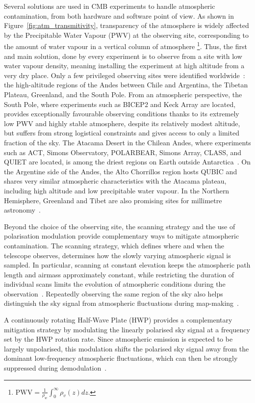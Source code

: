 \documentclass[a4paper,11pt]{article}
\begin{document}
Several solutions are used in CMB experiments to handle atmospheric contamination, from both hardware and software point of view. 
As shown in Figure~\ref{fig:atm_transmitivity}, transparency of the atmosphere is widely affected by the Precipitable Water Vapour (PWV) at the observing site, corresponding to the amount of water vapour in a vertical column of atmosphere \footnote{$\mathrm{PWV} = \frac{1}{\rho_w} \int_0^{\infty} \rho_v(z) dz.$}. Thus, the first and main solution, done by every experiment is to observe from a site with low water vapour density, meaning installing the experiment at high altitude from a very dry place. Only a few privileged observing sites were identified worldwide~\cite{Suen_2014}: the high-altitude regions of the Andes between Chile and Argentina, the Tibetan Plateau, Greenland, and the South Pole. From an atmospheric perspective, the South Pole, where experiments such as BICEP2 and Keck Array are located, provides exceptionally favourable observing conditions thanks to its extremely low PWV and highly stable atmosphere, despite its relatively modest altitude, but suffers from strong logistical constraints and gives access to only a limited fraction of the sky. The Atacama Desert in the Chilean Andes, where experiments such as ACT, Simons Observatory, POLARBEAR, Simons Array, CLASS, and QUIET are located, is among the driest regions on Earth outside Antarctica~\cite{Atacama}. On the Argentine side of the Andes, the Alto Chorrillos region hosts QUBIC and shares very similar atmospheric characteristics with the Atacama plateau, including high altitude and low precipitable water vapour. In the Northern Hemisphere, Greenland and Tibet are also promising sites for millimetre astronomy~\cite{tibet_greenland}. 

Beyond the choice of the observing site, the scanning strategy and the use of polarisation modulation provide complementary ways to mitigate atmospheric contamination. The scanning strategy, which defines where and when the telescope observes, determines how the slowly varying atmospheric signal is sampled. In particular, scanning at constant elevation keeps the atmospheric path length and airmass approximately constant, while restricting the duration of individual scans limits the evolution of atmospheric conditions during the observation~\cite{errard2015}. Repeatedly observing the same region of the sky also helps distinguish the sky signal from atmospheric fluctuations during map-making~\cite{errard2015}.

A continuously rotating Half-Wave Plate (HWP) provides a complementary mitigation strategy by modulating the linearly polarised sky signal at a frequency set by the HWP rotation rate. Since atmospheric emission is expected to be largely unpolarised, this modulation shifts the polarised sky signal away from the dominant low-frequency atmospheric fluctuations, which can then be strongly suppressed during demodulation~\cite{Kusaka_2014,Biquard_2025}.
\end{document}
